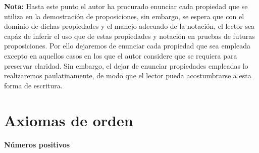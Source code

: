 \documentclass[11pt]{article}
\begin{document}
\textbf{Nota:} Hasta este punto el autor ha procurado enunciar cada propiedad que se utiliza en la demostración de proposiciones, sin embargo, se espera que con el dominio de dichas propiedades y el manejo adecuado de la notación, el lector sea capáz de inferir el uso que de estas propiedades y notación en pruebas de futuras proposiciones. Por ello dejaremos de enunciar cada propiedad que sea empleada excepto en aquellos casos en los que el autor considere que se requiera para preservar claridad. Sin embargo, el dejar de enunciar propiedades empleadas lo realizaremos paulatinamente, de modo que el lector pueda acostumbrarse a esta forma de escritura.

\pagebreak

\part*{Axiomas de orden}

\subsection*{Números positivos}
\end{document}

